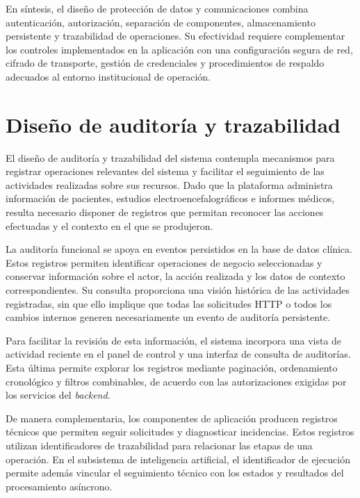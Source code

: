En síntesis, el diseño de protección de datos y comunicaciones combina autenticación, autorización, separación de componentes, almacenamiento persistente y trazabilidad de operaciones. Su efectividad requiere complementar los controles implementados en la aplicación con una configuración segura de red, cifrado de transporte, gestión de credenciales y procedimientos de respaldo adecuados al entorno institucional de operación.

\section{Diseño de auditoría y trazabilidad}
\label{sec:diseno-auditoria-trazabilidad}

El diseño de auditoría y trazabilidad del sistema contempla mecanismos para registrar operaciones relevantes del sistema y facilitar el seguimiento de las actividades realizadas sobre sus recursos. Dado que la plataforma administra información de pacientes, estudios electroencefalográficos e informes médicos, resulta necesario disponer de registros que permitan reconocer las acciones efectuadas y el contexto en el que se produjeron.

La auditoría funcional se apoya en eventos persistidos en la base de datos clínica. Estos registros permiten identificar operaciones de negocio seleccionadas y conservar información sobre el actor, la acción realizada y los datos de contexto correspondientes. Su consulta proporciona una visión histórica de las actividades registradas, sin que ello implique que todas las solicitudes HTTP o todos los cambios internos generen necesariamente un evento de auditoría persistente.

Para facilitar la revisión de esta información, el sistema incorpora una vista de actividad reciente en el panel de control y una interfaz de consulta de auditorías. Esta última permite explorar los registros mediante paginación, ordenamiento cronológico y filtros combinables, de acuerdo con las autorizaciones exigidas por los servicios del \textit{backend}.

De manera complementaria, los componentes de aplicación producen registros técnicos que permiten seguir solicitudes y diagnosticar incidencias. Estos registros utilizan identificadores de trazabilidad para relacionar las etapas de una operación. En el subsistema de inteligencia artificial, el identificador de ejecución permite además vincular el seguimiento técnico con los estados y resultados del procesamiento asíncrono.


